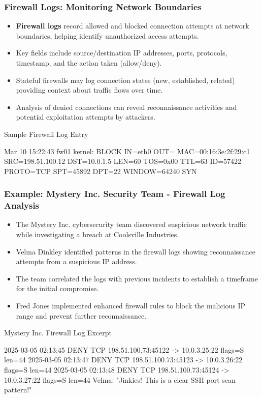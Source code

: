 \documentclass{beamer}
\begin{document}
\begin{frame}[fragile]
\frametitle{Firewall Logs: Monitoring Network Boundaries}
\begin{itemize}
\item \textbf{Firewall logs} record allowed and blocked connection attempts at network boundaries, helping identify unauthorized access attempts.
\item Key fields include source/destination IP addresses, ports, protocols, timestamp, and the action taken (allow/deny).
\item Stateful firewalls may log connection states (new, established, related) providing context about traffic flows over time.
\item Analysis of denied connections can reveal reconnaissance activities and potential exploitation attempts by attackers.
\end{itemize}

\begin{exampleblock}{Sample Firewall Log Entry}
\scriptsize
\begin{semiverbatim}
Mar 10 15:22:43 fw01 kernel: BLOCK IN=eth0 OUT= 
MAC=00:16:3e:2f:29:c1 SRC=198.51.100.12 DST=10.0.1.5 
LEN=60 TOS=0x00 TTL=63 ID=57422 PROTO=TCP 
SPT=45892 DPT=22 WINDOW=64240 SYN
\end{semiverbatim}
\end{exampleblock}
\end{frame}

\begin{frame}[fragile]
    \scriptsize
\frametitle{Example: Mystery Inc. Security Team - Firewall Log Analysis}
\begin{itemize}
\item The Mystery Inc. cybersecurity team discovered suspicious network traffic while investigating a breach at Coolsville Industries.
\item Velma Dinkley identified patterns in the firewall logs showing reconnaissance attempts from a suspicious IP address.
\item The team correlated the logs with previous incidents to establish a timeframe for the initial compromise.
\item Fred Jones implemented enhanced firewall rules to block the malicious IP range and prevent further reconnaissance.
\end{itemize}

\begin{exampleblock}{Mystery Inc. Firewall Log Excerpt}
\begin{semiverbatim}
2025-03-05 02:13:45 DENY TCP 198.51.100.73:45122 -> 10.0.3.25:22 
flags=S len=44 
2025-03-05 02:13:47 DENY TCP 198.51.100.73:45123 -> 10.0.3.26:22 
flags=S len=44
2025-03-05 02:13:48 DENY TCP 198.51.100.73:45124 -> 10.0.3.27:22 
flags=S len=44
Velma: "Jinkies! This is a clear SSH port scan pattern!"
\end{semiverbatim}
\end{exampleblock}
\end{frame}
\end{document}
